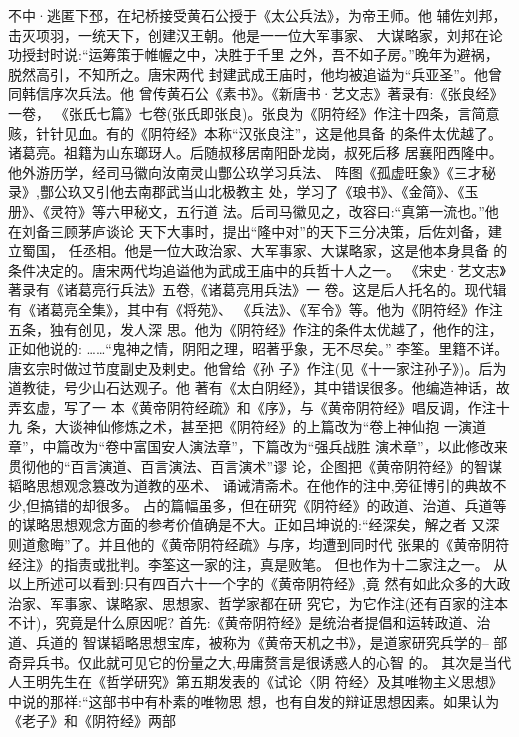 \documentclass[12pt,UTF8]{ctexbook}
\begin{document}
不中·逃匿下邳，在圮桥接受黄石公授于《太公兵法》，为帝王师。他
辅佐刘邦，击灭项羽，一统天下，创建汉王朝。他是一一位大军事家、
大谋略家，刘邦在论功授封时说:“运筹策于帷幄之中，决胜于千里
之外，吾不如子房。”晚年为避祸，脱然高引，不知所之。唐宋两代
封建武成王庙时，他均被追谥为“兵亚圣”。他曾同韩信序次兵法。他
曾传黄石公《素书》。《新唐书·艺文志》著录有:《张良经》一卷，
《张氏七篇》七卷(张氏即张良)。张良为《阴符经》作注十四条，言简意赅，针针见血。有的《阴符经》本称“汉张良注”，这是他具备
的条件太优越了。
诸葛亮。祖籍为山东瑯玡人。后随叔移居南阳卧龙岗，叔死后移
居襄阳西隆中。他外游历学，经司马徽向汝南灵山酆公玖学习兵法、
阵图《孤虚旺象》《三才秘录》,酆公玖又引他去南郡武当山北极教主
处，学习了《琅书》、《金简》、《玉册》、《灵符》等六甲秘文，五行道
法。后司马徽见之，改容曰:“真第一流也。”他在刘备三顾茅庐谈论
天下大事时，提出“隆中对”的天下三分决策，后佐刘备，建立蜀国，
任丞相。他是一位大政治家、大军事家、大谋略家，这是他本身具备
的条件决定的。唐宋两代均追谥他为武成王庙中的兵哲十人之一。
《宋史·艺文志》著录有《诸葛亮行兵法》五卷,《诸葛亮用兵法》一
卷。这是后人托名的。现代辑有《诸葛亮全集》，其中有《将苑》、
《兵法》、《军令》等。他为《阴符经》作注五条，独有创见，发人深
思。他为《阴符经》作注的条件太优越了，他作的注，正如他说的:
……“鬼神之情，阴阳之理，昭著乎象，无不尽矣。”
李筌。里籍不详。唐玄宗时做过节度副史及剌史。他曾给《孙
子》作注(见《十一家注孙子》)。后为道教徒，号少山石达观子。他
著有《太白阴经》，其中错误很多。他编造神话，故弄玄虚，写了一
本《黄帝阴符经疏》和《序》，与《黄帝阴符经》唱反调，作注十九
条，大谈神仙修炼之术，甚至把《阴符经》的上篇改为“卷上神仙抱
一演道章”，中篇改为“卷中富国安人演法章”，下篇改为“强兵战胜
演术章”，以此修改来贯彻他的“百言演道、百言演法、百言演术”谬
论，企图把《黄帝阴符经》的智谋韬略思想观念篡改为道教的巫术、
诵诫清斋术。在他作的注中,旁征博引的典故不少,但搞错的却很多。
占的篇幅虽多，但在研究《阴符经》的政道、治道、兵道等的谋略思想观念方面的参考价值确是不大。正如吕坤说的:“经深矣，解之者
又深则道愈晦”了。并且他的《黄帝阴符经疏》与序，均遭到同时代
张果的《黄帝阴符经注》的指责或批判。李筌这一家的注，真是败笔。
但也作为十二家注之一。
从以上所述可以看到:只有四百六十一个字的《黄帝阴符经》,竟
然有如此众多的大政治家、军事家、谋略家、思想家、哲学家都在研
究它，为它作注(还有百家的注本不计)，究竟是什么原因呢?
首先:《黄帝阴符经》是统治者提倡和运转政道、治道、兵道的
智谋韬略思想宝库，被称为《黄帝天机之书》，是道家研究兵学的--
部奇异兵书。仅此就可见它的份量之大,毋庸赘言是很诱惑人的心智
的。
其次是当代人王明先生在《哲学研究》第五期发表的《试论〈阴
符经〉及其唯物主义思想》中说的那祥:“这部书中有朴素的唯物思
想，也有自发的辩证思想因素。如果认为《老子》和《阴符经》两部
\end{document}
